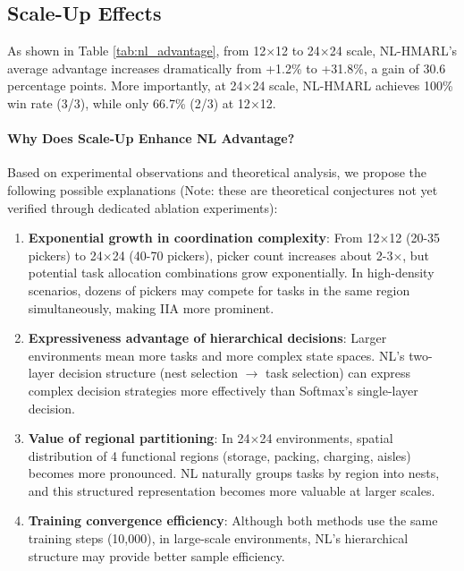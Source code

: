 \documentclass[12pt,a4paper]{article}
\begin{document}
\subsection{Scale-Up Effects}

As shown in Table \ref{tab:nl_advantage}, from 12$\times$12 to 24$\times$24 scale, NL-HMARL's average advantage increases dramatically from +1.2\% to +31.8\%, a gain of 30.6 percentage points. More importantly, at 24$\times$24 scale, NL-HMARL achieves 100\% win rate (3/3), while only 66.7\% (2/3) at 12$\times$12.

\paragraph{Why Does Scale-Up Enhance NL Advantage?}

Based on experimental observations and theoretical analysis, we propose the following possible explanations (Note: these are theoretical conjectures not yet verified through dedicated ablation experiments):

\begin{enumerate}
\item \textbf{Exponential growth in coordination complexity}: From 12$\times$12 (20-35 pickers) to 24$\times$24 (40-70 pickers), picker count increases about 2-3$\times$, but potential task allocation combinations grow exponentially. In high-density scenarios, dozens of pickers may compete for tasks in the same region simultaneously, making IIA more prominent.

\item \textbf{Expressiveness advantage of hierarchical decisions}: Larger environments mean more tasks and more complex state spaces. NL's two-layer decision structure (nest selection $\to$ task selection) can express complex decision strategies more effectively than Softmax's single-layer decision.

\item \textbf{Value of regional partitioning}: In 24$\times$24 environments, spatial distribution of 4 functional regions (storage, packing, charging, aisles) becomes more pronounced. NL naturally groups tasks by region into nests, and this structured representation becomes more valuable at larger scales.

\item \textbf{Training convergence efficiency}: Although both methods use the same training steps (10,000), in large-scale environments, NL's hierarchical structure may provide better sample efficiency.
\end{enumerate}
\end{document}
